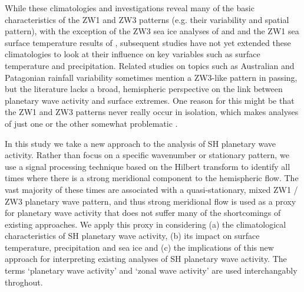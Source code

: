 While these climatologies and investigations reveal many of the basic characteristics of the ZW1 and ZW3 patterns (e.g. their variability and spatial pattern), with the exception of the ZW3 sea ice analyses of \citet{Raphael2007} and \citet{Yuan2008} and the ZW1 sea surface temperature results of \citet{Hobbs2007}, subsequent studies have not yet extended these climatologies to look at their influence on key variables such as surface temperature and precipitation. Related studies on topics such as Australian \citep{Frederiksen2014} and Patagonian \citep{Garreaud2013} rainfall variability sometimes mention a ZW3-like pattern in passing, but the literature lacks a broad, hemispheric perspective on the link between planetary wave activity and surface extremes. One reason for this might be that the ZW1 and ZW3 patterns never really occur in isolation, which makes analyses of just one or the other somewhat problematic \citep{Hobbs2010}.

In this study we take a new approach to the analysis of SH planetary wave activity. Rather than focus on a specific wavenumber or stationary pattern, we use a signal processing technique based on the Hilbert transform to identify all times where there is a strong meridional component to the hemispheric flow. The vast majority of these times are associated with a quasi-stationary, mixed ZW1 / ZW3 planetary wave pattern, and thus strong meridional flow is used as a proxy for planetary wave activity that does not suffer many of the shortcomings of existing approaches. We apply this proxy in considering (a) the climatological characteristics of SH planetary wave activity, (b) its impact on surface temperature, precipitation and sea ice and (c) the implications of this new approach for interpreting existing analyses of SH planetary wave activity. The terms `planetary wave activity' and `zonal wave activity' are used interchangably throghout.